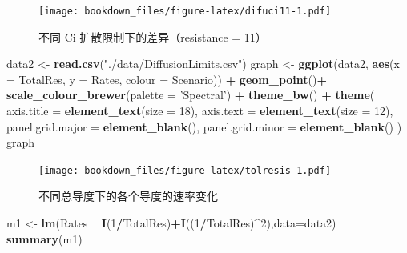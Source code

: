 \documentclass[
]{krantz}
\makeatletter
\newenvironment{Shaded}{\begin{snugshade}}{\end{snugshade}}
\newcommand{\DataTypeTok}[1]{\textcolor[rgb]{0.13,0.29,0.53}{#1}}
\newcommand{\DecValTok}[1]{\textcolor[rgb]{0.00,0.00,0.81}{#1}}
\newcommand{\KeywordTok}[1]{\textcolor[rgb]{0.13,0.29,0.53}{\textbf{#1}}}
\newcommand{\NormalTok}[1]{#1}
\newcommand{\OperatorTok}[1]{\textcolor[rgb]{0.81,0.36,0.00}{\textbf{#1}}}
\newcommand{\StringTok}[1]{\textcolor[rgb]{0.31,0.60,0.02}{#1}}
\newenvironment{kframe}{%
\medskip{}
\setlength{\fboxsep}{.8em}
 \def\at@end@of@kframe{}%
 \ifinner\ifhmode%
  \def\at@end@of@kframe{\end{minipage}}%
  \begin{minipage}{\columnwidth}%
 \fi\fi%
 \def\FrameCommand##1{\hskip\@totalleftmargin \hskip-\fboxsep
 \colorbox{shadecolor}{##1}\hskip-\fboxsep
     \hskip-\linewidth \hskip-\@totalleftmargin \hskip\columnwidth}%
 \MakeFramed {\advance\hsize-\width
   \@totalleftmargin\z@ \linewidth\hsize
   \@setminipage}}%
 {\par\unskip\endMakeFramed%
 \at@end@of@kframe}
\renewenvironment{Shaded}{\begin{kframe}}{\end{kframe}}
\makeatother
\begin{document}
\begin{figure}
\centering
\texttt{[image: bookdown\_files/figure-latex/difuci11-1.pdf]}
\caption{\label{fig:difuci11}不同 Ci 扩散限制下的差异（resistance = 11）}
\end{figure}

\begin{Shaded}
\begin{Highlighting}[]
\NormalTok{data2 <-}\StringTok{ }\KeywordTok{read.csv}\NormalTok{(}\StringTok{"./data/DiffusionLimits.csv"}\NormalTok{)}
\NormalTok{graph <-}\StringTok{ }\KeywordTok{ggplot}\NormalTok{(data2, }\KeywordTok{aes}\NormalTok{(}\DataTypeTok{x =}\NormalTok{ TotalRes, }\DataTypeTok{y =}\NormalTok{ Rates, }\DataTypeTok{colour =}\NormalTok{ Scenario)) }\OperatorTok{+}
\StringTok{  }\KeywordTok{geom_point}\NormalTok{()}\OperatorTok{+}
\StringTok{  }\KeywordTok{scale_colour_brewer}\NormalTok{(}\DataTypeTok{palette =} \StringTok{'Spectral'}\NormalTok{) }\OperatorTok{+}
\StringTok{  }\KeywordTok{theme_bw}\NormalTok{() }\OperatorTok{+}
\StringTok{  }\KeywordTok{theme}\NormalTok{(}
    \DataTypeTok{axis.title =} \KeywordTok{element_text}\NormalTok{(}\DataTypeTok{size =} \DecValTok{18}\NormalTok{),}
    \DataTypeTok{axis.text =} \KeywordTok{element_text}\NormalTok{(}\DataTypeTok{size =} \DecValTok{12}\NormalTok{),}
    \DataTypeTok{panel.grid.major =} \KeywordTok{element_blank}\NormalTok{(),}
    \DataTypeTok{panel.grid.minor =} \KeywordTok{element_blank}\NormalTok{()}
\NormalTok{  )}
\NormalTok{graph}
\end{Highlighting}
\end{Shaded}

\begin{figure}
\centering
\texttt{[image: bookdown\_files/figure-latex/tolresis-1.pdf]}
\caption{\label{fig:tolresis}不同总导度下的各个导度的速率变化}
\end{figure}

\begin{Shaded}
\begin{Highlighting}[]
\NormalTok{m1 <-}\StringTok{ }\KeywordTok{lm}\NormalTok{(Rates }\OperatorTok{~}\StringTok{ }\KeywordTok{I}\NormalTok{(}\DecValTok{1}\OperatorTok{/}\NormalTok{TotalRes)}\OperatorTok{+}\KeywordTok{I}\NormalTok{((}\DecValTok{1}\OperatorTok{/}\NormalTok{TotalRes)}\OperatorTok{^}\DecValTok{2}\NormalTok{),}\DataTypeTok{data=}\NormalTok{data2)}
\KeywordTok{summary}\NormalTok{(m1)}
\end{Highlighting}
\end{Shaded}
\end{document}
